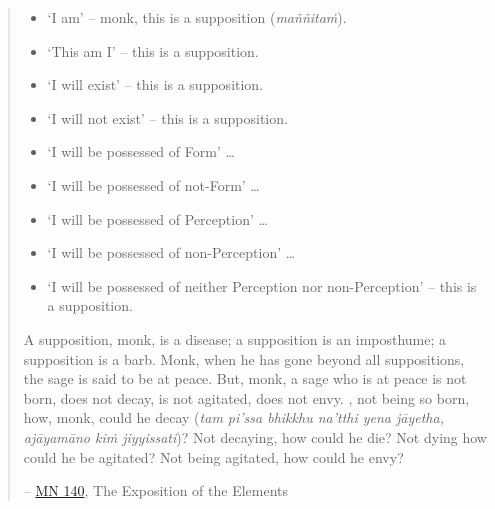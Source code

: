 \begin{quote}
\begin{itemize}
\item
  `I am' -- monk, this is a supposition (\emph{maññitaṁ}).
\item
  `This am I' -- this is a supposition.
\item
  `I will exist' -- this is a supposition.
\item
  `I will not exist' -- this is a supposition.
\item
  `I will be possessed of Form' \ldots\hspace{0pt}
\item
  `I will be possessed of not-Form' \ldots\hspace{0pt}
\item
  `I will be possessed of Perception' \ldots\hspace{0pt}
\item
  `I will be possessed of non-Perception' \ldots\hspace{0pt}
\item
  `I will be possessed of neither Perception nor non-Perception' -- this is a supposition.
\end{itemize}

A supposition, monk, is a disease; a supposition is an imposthume; a supposition is a barb. Monk, when he has gone beyond all suppositions, the sage is said to be at peace. But, monk, a sage who is at peace is not born, does not decay, is not agitated, does not envy. , not being so born, how, monk, could he decay (\emph{tam pi'ssa bhikkhu na'tthi yena jāyetha, ajāyamāno kiṁ jiyyissati})? Not decaying, how could he die? Not dying how could he be agitated? Not being agitated, how could he envy?

 -- \href{https://suttacentral.net/mn140/en/bodhi}{MN 140}, The Exposition of the Elements
\end{quote}

